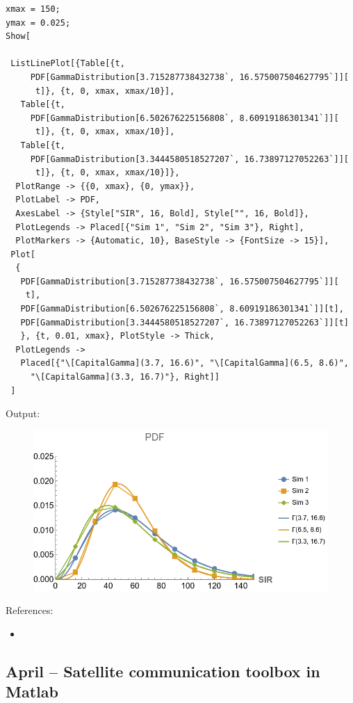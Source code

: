 \documentclass{article}
\begin{document}
\begin{verbatim}
xmax = 150;
ymax = 0.025;
Show[
 
 ListLinePlot[{Table[{t, 
     PDF[GammaDistribution[3.715287738432738`, 16.575007504627795`]][
      t]}, {t, 0, xmax, xmax/10}],
   Table[{t, 
     PDF[GammaDistribution[6.502676225156808`, 8.60919186301341`]][
      t]}, {t, 0, xmax, xmax/10}], 
   Table[{t, 
     PDF[GammaDistribution[3.3444580518527207`, 16.73897127052263`]][
      t]}, {t, 0, xmax, xmax/10}]}, 
  PlotRange -> {{0, xmax}, {0, ymax}},
  PlotLabel -> PDF,
  AxesLabel -> {Style["SIR", 16, Bold], Style["", 16, Bold]}, 
  PlotLegends -> Placed[{"Sim 1", "Sim 2", "Sim 3"}, Right], 
  PlotMarkers -> {Automatic, 10}, BaseStyle -> {FontSize -> 15}],
 Plot[
  {
   PDF[GammaDistribution[3.715287738432738`, 16.575007504627795`]][
    t],
   PDF[GammaDistribution[6.502676225156808`, 8.60919186301341`]][t],
   PDF[GammaDistribution[3.3444580518527207`, 16.73897127052263`]][t]
   }, {t, 0.01, xmax}, PlotStyle -> Thick, 
  PlotLegends -> 
   Placed[{"\[CapitalGamma](3.7, 16.6)", "\[CapitalGamma](6.5, 8.6)", 
     "\[CapitalGamma](3.3, 16.7)"}, Right]]
 ]
\end{verbatim}


Output:
\begin{figure}
  \includegraphics[width=\linewidth]{listlineplot.png}
\end{figure}


References:
\begin{itemize}
\item {}
\end{itemize}


\subsection{April – Satellite communication toolbox in Matlab}
\end{document}
